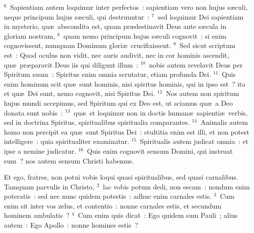 ${}^{6}$~Sapientiam autem loquimur inter perfectos~: sapientiam vero non hujus s\ae culi, neque principum hujus s\ae culi, qui destruuntur~:
${}^{7}$~sed loquimur Dei sapientiam in mysterio, qu\ae\ abscondita est, quam pr\ae destinavit Deus ante s\ae cula in gloriam nostram,
${}^{8}$~quam nemo principum hujus s\ae culi cognovit~: si enim cognovissent, numquam Dominum glori\ae\ crucifixissent.
${}^{9}$~Sed sicut scriptum est~: Quod oculus non vidit, nec auris audivit, nec in cor hominis ascendit, qu\ae\ pr\ae paravit Deus iis qui diligunt illum~:
${}^{10}$~nobis autem revelavit Deus per Spiritum suum~: Spiritus enim omnia scrutatur, etiam profunda Dei.
${}^{11}$~Quis enim hominum scit qu\ae\ sunt hominis, nisi spiritus hominis, qui in ipso est~? ita et qu\ae\ Dei sunt, nemo cognovit, nisi Spiritus Dei.
${}^{12}$~Nos autem non spiritum hujus mundi accepimus, sed Spiritum qui ex Deo est, ut sciamus qu\ae\ a Deo donata sunt nobis~:
${}^{13}$~qu\ae\ et loquimur non in doctis human\ae\ sapienti\ae\ verbis, sed in doctrina Spiritus, spiritualibus spiritualia comparantes.
${}^{14}$~Animalis autem homo non percipit ea qu\ae\ sunt Spiritus Dei~: stultitia enim est illi, et non potest intelligere~: quia spiritualiter examinatur.
${}^{15}$~Spiritualis autem judicat omnia~: et ipse a nemine judicatur.
${}^{16}$~Quis enim cognovit sensum Domini, qui instruat eum~? nos autem sensum Christi habemus.

\lettrine[lines=10,image=true,loversize=0.05,lraise=-0.03]{E}{}t ego, fratres, non potui vobis loqui quasi spiritualibus, sed quasi carnalibus. Tamquam parvulis in Christo,
${}^{2}$~lac vobis potum dedi, non escam~: nondum enim poteratis~: sed nec nunc quidem potestis~: adhuc enim carnales estis.
${}^{3}$~Cum enim sit inter vos zelus, et contentio~: nonne carnales estis, et secundum hominem ambulatis~?
${}^{4}$~Cum enim quis dicat~: Ego quidem sum Pauli~; alius autem~: Ego Apollo~: nonne homines estis~?

